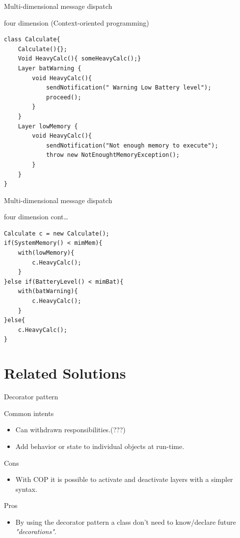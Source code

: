 \documentclass[presentation]{beamer}
\begin{document}
\begin{frame}[fragile,label={sec:orgc7dcc58}]{Multi-dimensional message dispatch}
 \begin{block}{four dimension (Context-oriented programming)}
\begin{verbatim}
class Calculate{
    Calculate(){};
    Void HeavyCalc(){ someHeavyCalc();}
    Layer batWarning {
        void HeavyCalc(){
            sendNotification(" Warning Low Battery level");
            proceed();
        }
    }
    Layer lowMemory {
        void HeavyCalc(){
            sendNotification("Not enough memory to execute");
            throw new NotEnoughtMemoryException();
        }
    }
}
\end{verbatim}
\end{block}
\end{frame}


\begin{frame}[fragile,label={sec:org7496f79}]{Multi-dimensional message dispatch}
 \begin{block}{four dimension  cont\ldots{}}
\begin{verbatim}
Calculate c = new Calculate();
if(SystemMemory() < mimMem){
    with(lowMemory){
        c.HeavyCalc();
    }
}else if(BatteryLevel() < mimBat){
    with(batWarning){
        c.HeavyCalc();
    }
}else{
    c.HeavyCalc();
}
\end{verbatim}
\end{block}
\end{frame}

\section{Related Solutions}
\label{sec:orge928c76}

\begin{frame}[label={sec:org55587d9}]{Decorator pattern}
\begin{block}{Common intents}
\begin{itemize}
\item Can withdrawn responsibilities.(???)
\item Add behavior or state to individual objects at run-time.
\end{itemize}
\end{block}

\begin{block}{Cons}
\begin{itemize}
\item With COP it is possible to activate and deactivate layers with a simpler syntax.
\end{itemize}
\end{block}

\begin{block}{Pros}
\begin{itemize}
\item By using the decorator pattern a class don't need to know/declare future \emph{"decorations"}.
\end{itemize}
\end{block}
\end{frame}
\end{document}
